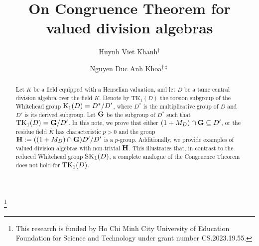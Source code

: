 \documentclass{amsart}
\theoremstyle{definition}
\numberwithin{equation}{section} %
\begin{document}
\title[On Congruence Theorem for valued division algebras]{On Congruence Theorem for valued division algebras}

\author[Huynh Viet Khanh]{Huynh Viet Khanh$^\dagger$}
\address{$^\dagger$Department of Mathematics and Informatics, HCMC University of Education, 280 An Duong Vuong Str., Dist. 5, Ho Chi Minh City, Vietnam}

\author[Nguyen Duc Anh Khoa]{Nguyen Duc Anh Khoa$^{\dagger\ddagger}$}
\address{$^\ddagger$Department of Mathematics, Le Hong Phong High School for the Gifted, 235 Nguyen Van Cu Str., Dist. 5, Ho Chi Minh City, Vietnam}
\thanks{This research is funded by Ho Chi Minh City University of Education Foundation for Science and Technology under grant number CS.2023.19.55.}
	
\begin{abstract} 
	Let $K$ be a field equipped with a Henselian valuation, and let $D$ be a tame central division algebra over the field $K$. Denote by $\mathrm{TK}_1(D)$ the torsion subgroup of the Whitehead group ${\rm K}_1(D) = D^*/D'$, where $D^*$ is the multiplicative group of $D$ and $D'$ is its derived subgroup. Let ${\bf G}$ be the subgroup of $D^*$ such that $\mathrm{TK}_1(D) = {\bf G}/D'$. In this note, we prove that either $(1 + M_D) \cap {\bf G} \subseteq D'$, or the residue field $\overline{K}$ has characteristic $p > 0$ and the group ${\bf H} := ((1 + M_D) \cap {\bf G})D'/D'$ is a $p$-group. Additionally, we provide examples of valued division algebras with non-trivial ${\bf H}$. This illustrates that, in contrast to the reduced Whitehead group \({\rm SK}_1(D)\), a complete analogue of the Congruence Theorem does not hold for \({\rm TK}_1(D)\).
\end{abstract}
\maketitle
\end{document}
